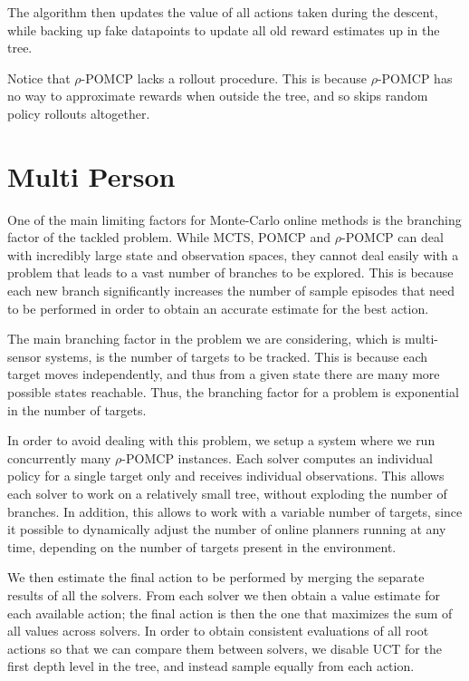The algorithm then updates the value of all actions taken during the descent, while backing up fake
datapoints to update all old reward estimates up in the tree.

Notice that $\rho$-POMCP lacks a rollout procedure. This is because $\rho$-POMCP has no way to
approximate rewards when outside the tree, and so skips random policy rollouts altogether.

\section{Multi Person}

One of the main limiting factors for Monte-Carlo online methods is the branching factor of the
tackled problem. While MCTS, POMCP and $\rho$-POMCP can deal with incredibly large state and
observation spaces, they cannot deal easily with a problem that leads to a vast number of branches
to be explored. This is because each new branch significantly increases the number of sample
episodes that need to be performed in order to obtain an accurate estimate for the best action.

The main branching factor in the problem we are considering, which is multi-sensor systems, is the
number of targets to be tracked. This is because each target moves independently, and thus from a
given state there are many more possible states reachable. Thus, the branching factor for a problem
is exponential in the number of targets.

In order to avoid dealing with this problem, we setup a system where we run concurrently many
$\rho$-POMCP instances. Each solver computes an individual policy for a single target only and
receives individual observations. This allows each solver to work on a relatively small tree,
without exploding the number of branches. In addition, this allows to work with a variable number of
targets, since it possible to dynamically adjust the number of online planners running at any time,
depending on the number of targets present in the environment.

We then estimate the final action to be performed by merging the separate results of all the
solvers.  From each solver we then obtain a value estimate for each available action; the final
action is then the one that maximizes the sum of all values across solvers. In order to obtain
consistent evaluations of all root actions so that we can compare them between solvers, we disable
UCT for the first depth level in the tree, and instead sample equally from each action.
